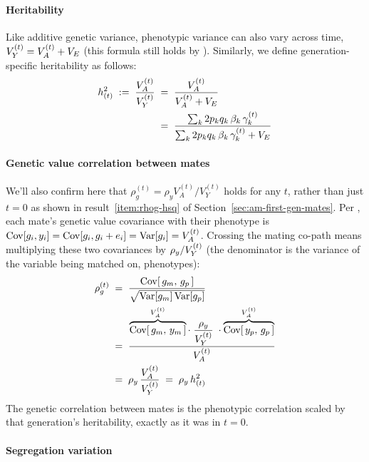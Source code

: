 \documentclass[12pt]{article}
\numberwithin{equation}{section}
\begin{document}
\paragraph{Heritability}
Like additive genetic variance, phenotypic variance can also vary across time, $V_Y^{(t)} = V_A^{(t)} + V_E$ (this formula still holds by ).
Similarly, we define generation-specific heritability as follows:
\begin{equation}\label{eq:hsq-t}
\begin{aligned}
    h^2_{(t)} \;:=\; \frac{V_A^{(t)}}{V_Y^{(t)}} \;&=\; \frac{V_A^{(t)}}{V_A^{(t)} + V_E} \\
    \;&=\; \frac{\sum_k 2 p_k q_k\, \beta_k\, \gamma^{(t)}_k}{\sum_k 2 p_k q_k\, \beta_k\, \gamma^{(t)}_k + V_E}
\end{aligned}
\end{equation}

\paragraph{Genetic value correlation between mates}
We'll also confirm here that $\rho_g^{(t)} = \rho_y V_A^{(t)} / V_Y^{(t)} $ holds for any $t$, rather than just $t=0$ as shown in result~\ref{item:rhog-hsq} of Section~\ref{sec:am-first-gen-mates}.
Per , each mate's genetic value covariance with their phenotype is $\mathrm{Cov}[g_i, y_i] = \mathrm{Cov}[g_i, g_i + e_i] = \mathrm{Var}[g_i] = V_A^{(t)}$.
Crossing the mating co-path means multiplying these two covariances by $\rho_y / V_Y^{(t)}$ (the denominator is the variance of the variable being matched on, phenotypes):
\begin{equation}\label{eq:rhog-t}
\begin{aligned}
    \rho_g^{(t)} \;&=\; \frac{\mathrm{Cov}[\,g_m,\, g_p\,]}{\sqrt{\mathrm{Var}[g_m]\,\mathrm{Var}[g_p]}} \\
    \;&=\; \frac{\overbrace{\mathrm{Cov}[\,g_m,\, y_m\,]}^{V_A^{(t)}} \cdot\; \dfrac{\rho_y}{V_Y^{(t)}} \;\cdot \overbrace{\mathrm{Cov}[\,y_p,\, g_p\,]}^{V_A^{(t)}}}{V_A^{(t)}} \\
    \;&=\; \rho_y\,\frac{V_A^{(t)}}{V_Y^{(t)}} \;=\; \rho_y\,h^2_{(t)}
\end{aligned}
\end{equation}
The genetic correlation between mates is the phenotypic correlation scaled by that generation's heritability, exactly as it was in $t=0$.

\paragraph{Segregation variation}
\end{document}

